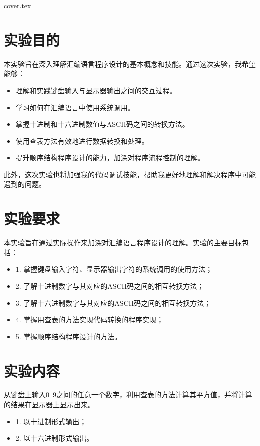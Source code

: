 \documentclass[12pt]{article}
\begin{document}
 {cover.tex}
\section{实验目的}
本实验旨在深入理解汇编语言程序设计的基本概念和技能。通过这次实验，我希望能够：
\begin{itemize}
    \item 理解和实践键盘输入与显示器输出之间的交互过程。
    \item 学习如何在汇编语言中使用系统调用。
    \item 掌握十进制和十六进制数值与ASCII码之间的转换方法。
    \item 使用查表方法有效地进行数据转换和处理。
    \item 提升顺序结构程序设计的能力，加深对程序流程控制的理解。
\end{itemize}

此外，这次实验也将加强我的代码调试技能，帮助我更好地理解和解决程序中可能遇到的问题。
\section{实验要求}
本实验旨在通过实际操作来加深对汇编语言程序设计的理解。实验的主要目标包括：
\begin{itemize}
    \item 1. 掌握键盘输入字符、显示器输出字符的系统调用的使用方法；
    \item 2. 了解十进制数字与其对应的ASCII码之间的相互转换方法；
    \item 3. 了解十六进制数字与其对应的ASCII码之间的相互转换方法；
    \item 4. 掌握用查表的方法实现代码转换的程序实现；
    \item 5. 掌握顺序结构程序设计的方法。
\end{itemize}

\section{实验内容}
从键盘上输入0~9之间的任意一个数字，利用查表的方法计算其平方值，并将计算的结果在显示器上显示出来。
\begin{itemize}
    \item 1. 以十进制形式输出； 
    \item 2. 以十六进制形式输出。
\end{itemize}
\end{document}

